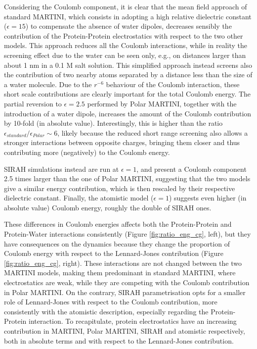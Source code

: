 Considering the Coulomb component, it is clear that the mean field approach of standard MARTINI, which consists in adopting a high relative dielectric constant ($\epsilon = 15$) to compensate the absence of water dipoles, decreases sensibly the contribution of the Protein-Protein electrostatics with respect to the two other models.
%
This approach reduces all the Coulomb interactions, while in reality the screening effect due to the water can be seen only, e.g., on distances larger than about 1 nm in a 0.1 M salt solution. This simplified approach instead screens also the contribution of two nearby atoms separated by a distance less than the size of a water molecule. Due to the $r^{-6}$ behaviour of the Coulomb interaction, these short scale contributions are clearly important for the total Coulomb energy.
%
The partial reversion to $\epsilon = 2.5$ performed by Polar MARTINI, together with the introduction of a water dipole, increases the amount of the Coulomb contribution by 10-fold (in absolute value).
%
Interestingly, this is higher than the ratio $\epsilon_{standard}/\epsilon_{Polar} \sim 6$, likely because the reduced short range screening also allows a stronger interactions between opposite charges, bringing them closer and thus contributing more (negatively) to the Coulomb energy.

SIRAH simulations instead are run at $\epsilon = 1$, and present a Coulomb component 2.5 times larger than the one of Polar MARTINI, suggesting that the two models give a similar energy contribution, which is then rescaled by their respective dielectric constant.
%
Finally, the atomistic model ($\epsilon = 1$) suggests even higher (in absolute value) Coulomb energy, roughly the double of SIRAH ones.


These differences in Coulomb energies affects both the Protein-Protein and Protein-Water interactions consistently (Figure \ref{fig:ratio_eng_cg}, left), but they have consequences on the dynamics because they change the proportion of Coulomb energy with respect to the Lennard-Jones contribution (Figure \ref{fig:ratio_eng_cg}, right). These interactions are not changed between the two MARTINI models, making them predominant in standard MARTINI, where electrostatics are weak, while they are competing with the Coulomb contribution in Polar MARTINI.
%
On the contrary, SIRAH parametrisation opts for a smaller role of Lennard-Jones with respect to the Coulomb contribution, more consistently with the atomistic description, especially regarding the Protein-Protein interaction.
%
To recapitulate, protein electrostatics have an increasing contribution in MARTINI, Polar MARTINI, SIRAH and atomistic respectively, both in absolute terms and with respect to the Lennard-Jones contribution.

